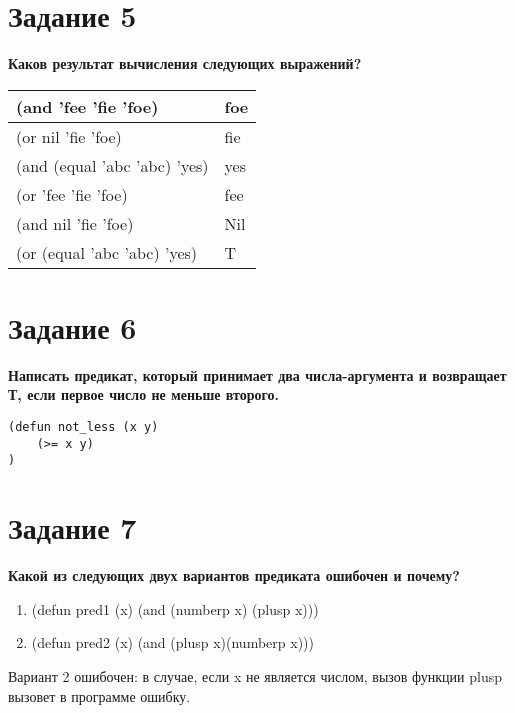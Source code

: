 \documentclass[a4paper,14pt, unknownkeysallowed]{extreport}
\begin{document}
\FloatBarrier
\section*{Задание 5}
\textbf{Каков результат вычисления следующих выражений?}

\begin{table}
	\begin{center}
		\begin{tabular}{|l|l|}
			\hline
			(and 'fee 'fie 'foe) & foe \\
			\hline
			(or nil 'fie 'foe) & fie \\
			\hline
			(and (equal 'abc 'abc) 'yes) & yes \\
			\hline
			(or 'fee 'fie 'foe) & fee \\
			\hline
			(and nil 'fie 'foe) & Nil \\
			\hline
			(or (equal 'abc 'abc) 'yes) & T \\
			\hline
		\end{tabular}
	\end{center}
\end{table}

\FloatBarrier

\section*{Задание 6}

\textbf{Написать предикат, который принимает два числа-аргумента и возвращает Т, если первое число не меньше второго.}

\begin{lstlisting}
(defun not_less (x y)
	(>= x y)
)
\end{lstlisting}

\section*{Задание 7}

\textbf{Какой из следующих двух вариантов предиката ошибочен и почему?}

\begin{enumerate}[label=\arabic*)]
	\item (defun pred1 (x) (and (numberp x) (plusp x)))
	\item (defun pred2 (x) (and (plusp x)(numberp x)))
\end{enumerate}

Вариант 2 ошибочен: в случае, если x не является числом, вызов функции plusp вызовет в программе ошибку.
\end{document}
